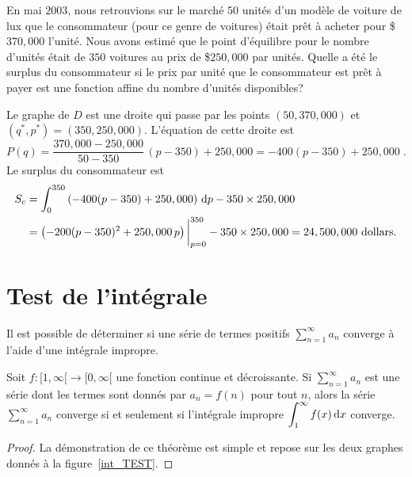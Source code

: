 {\begin{egg}
En mai $2003$, nous retrouvions sur le marché $50$ unités d'un
modèle de voiture de lux que le consommateur (pour ce genre de voitures)
était prêt à acheter pour \$$370,000$ l'unité.  Nous avons estimé que le point
d'équilibre pour le nombre d'unités était de $350$ voitures au prix de
\$$250,000$ par unités.  Quelle a été le surplus du consommateur si le
prix par unité que le consommateur est prêt à payer est une fonction
affine du nombre d'unités disponibles?

Le graphe de $D$ est une droite qui passe par les points
$(50, 370,000)$ et \\
$(q^\ast, p^\ast) = (350, 250,000)$.
L'équation de cette droite est
\[
P(q) = \frac{370,000-250,000}{50-350} \, (p-350) + 250,000
= -400 (p-350) + 250,000 \; .
\]
Le surplus du consommateur est
\begin{align*}
S_c &= \int_0^{350} \left(-400 (p-350) + 250,000\right)\,\mathrm{d}p -
350\times 250,000 \\
&= \left(-200 (p-350)^2 + 250,000 \, p \right)\bigg|_{p=0}^{350}
- 350\times 250,000
= 24,500,000 \text{ dollars}.
\end{align*}
\end{egg}

\section{Test de l'intégrale \eng}\label{integralTest}

Il est possible de déterminer si une série de termes positifs
$\displaystyle \sum_{n=1}^\infty a_n$ converge à l'aide d'une intégrale 
impropre.

\begin{theorem} 
Soit $f:[1,\infty[\rightarrow [0,\infty[$ une fonction continue et
décroissante.  Si $\displaystyle \sum_{n=1}^\infty a_n$ est une série dont
les termes sont donnés par $a_n = f(n)$ pour tout $n$, alors la série
$\displaystyle \sum_{n=1}^\infty a_n$ converge si et seulement si l'intégrale
impropre $\displaystyle \int_1^\infty f(x)\,\mathrm{d}x$ converge.
\end{theorem}

\begin{proof}
La démonstration de ce théorème est simple et repose sur les deux
graphes donnés à la figure~\ref{int_TEST}.



\end{proof}}
